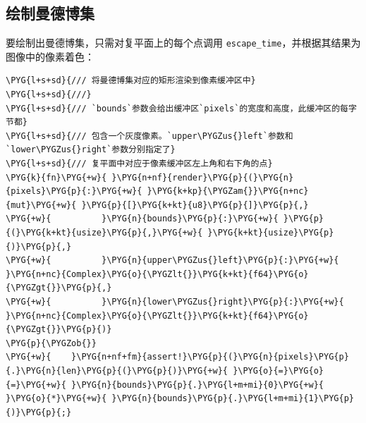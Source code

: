 \subsection{绘制曼德博集}

要绘制出曼德博集，只需对复平面上的每个点调用 \texttt{escape\_time}，并根据其结果为图像中的像素着色：

\begin{Verbatim}[commandchars=\\\{\},breaklines=true,breakanywhere=true,fontsize=\codefont,xleftmargin=17bp]
\PYG{l+s+sd}{/// 将曼德博集对应的矩形渲染到像素缓冲区中}
\PYG{l+s+sd}{///}
\PYG{l+s+sd}{/// `bounds`参数会给出缓冲区`pixels`的宽度和高度，此缓冲区的每字节都}
\PYG{l+s+sd}{/// 包含一个灰度像素。`upper\PYGZus{}left`参数和 `lower\PYGZus{}right`参数分别指定了}
\PYG{l+s+sd}{/// 复平面中对应于像素缓冲区左上角和右下角的点}
\PYG{k}{fn}\PYG{+w}{ }\PYG{n+nf}{render}\PYG{p}{(}\PYG{n}{pixels}\PYG{p}{:}\PYG{+w}{ }\PYG{k+kp}{\PYGZam{}}\PYG{n+nc}{mut}\PYG{+w}{ }\PYG{p}{[}\PYG{k+kt}{u8}\PYG{p}{]}\PYG{p}{,}
\PYG{+w}{          }\PYG{n}{bounds}\PYG{p}{:}\PYG{+w}{ }\PYG{p}{(}\PYG{k+kt}{usize}\PYG{p}{,}\PYG{+w}{ }\PYG{k+kt}{usize}\PYG{p}{)}\PYG{p}{,}
\PYG{+w}{          }\PYG{n}{upper\PYGZus{}left}\PYG{p}{:}\PYG{+w}{ }\PYG{n+nc}{Complex}\PYG{o}{\PYGZlt{}}\PYG{k+kt}{f64}\PYG{o}{\PYGZgt{}}\PYG{p}{,}
\PYG{+w}{          }\PYG{n}{lower\PYGZus{}right}\PYG{p}{:}\PYG{+w}{ }\PYG{n+nc}{Complex}\PYG{o}{\PYGZlt{}}\PYG{k+kt}{f64}\PYG{o}{\PYGZgt{}}\PYG{p}{)}
\PYG{p}{\PYGZob{}}
\PYG{+w}{    }\PYG{n+nf+fm}{assert!}\PYG{p}{(}\PYG{n}{pixels}\PYG{p}{.}\PYG{n}{len}\PYG{p}{(}\PYG{p}{)}\PYG{+w}{ }\PYG{o}{=}\PYG{o}{=}\PYG{+w}{ }\PYG{n}{bounds}\PYG{p}{.}\PYG{l+m+mi}{0}\PYG{+w}{ }\PYG{o}{*}\PYG{+w}{ }\PYG{n}{bounds}\PYG{p}{.}\PYG{l+m+mi}{1}\PYG{p}{)}\PYG{p}{;}


\end{Verbatim}
